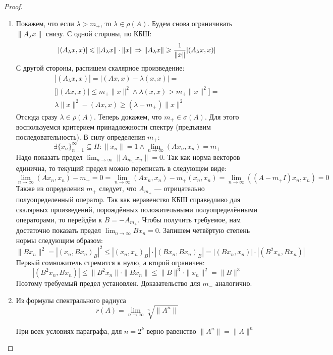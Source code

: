 \begin{proof}~
	\begin{enumerate}
		\item Покажем, что если $\lambda > m_+$, то $\lambda \in \rho(A)$. Будем снова ограничивать $\|A_\lambda x\|$ снизу. С одной стороны, по КБШ:
		\[
			|(A_\lambda x, x)| \leqslant \|A_\lambda x\| \cdot \|x\| \Rightarrow \|A_\lambda x\| \geqslant \frac{1}{\|x\|}|(A_\lambda x, x)|
		\]
		С другой стороны, распишем скалярное произведение:
		\begin{multline*}
			|(A_\lambda x, x)| = |(Ax, x) - \lambda(x, x)| =
			\\
			\Big[|(Ax, x)| \le m_+\|x\|^2 \wedge \lambda(x, x) > m_+\|x\|^2\Big] =
			\\
			\lambda\|x\|^2 - (Ax, x) \ge (\lambda - m_+)\|x\|^2
		\end{multline*}
		Отсюда сразу $\lambda \in \rho(A)$. Теперь докажем, что $m_+ \in \sigma(A)$. Для этого воспользуемся критерием принадлежности спектру (предъявим последовательность). В силу определения $m_+$:
		\[
			\exists \{x_n\}_{n = 1}^\infty \subseteq H \colon \|x_n\| = 1 \wedge \lim_{n \to \infty} (Ax_n, x_n) = m_+
		\]
		Надо показать предел $\lim_{n \to \infty} \|A_{m_+}x_n\| = 0$. Так как норма векторов единична, то текущий предел можно переписать в следующем виде:
		\[
			\lim_{n \to \infty} (Ax_n, x_n) - m_+ = 0 = \lim_{n \to \infty} (Ax_n, x_n) - m_+(x_n, x_n) = \lim_{n \to \infty} ((A - m_+I)x_n, x_n) = 0
		\]
		Также из определения $m_+$ следует, что $A_{m_+}$ --- отрицательно полуопределенный оператор. Так как неравенство КБШ справедливо для скалярных произведений, порождённых положительными полуопределёнными операторами, то перейдём к $B = -A_{m_+}$. Чтобы получить требуемое, нам достаточно показать предел $\lim_{n \to \infty} Bx_n = 0$. Запишем четвёртую степень нормы следующим образом:
		\[
			\|Bx_n\|^2 = |(x_n, Bx_n)_B|^2 \le |(x_n, x_n)_B| \cdot |(Bx_n, Bx_n)_B| = |(Bx_n, x_n)| \cdot |(B^2x_n, Bx_n)|
		\]
		Первый сомножитель стремится к нулю, а второй ограничен:
		\[
			|(B^2x_n, Bx_n)| \le \|B^2x_n\| \cdot \|Bx_n\| \le \|B\|^3 \cdot \|x_n\|^2 = \|B\|^3
		\]
		Поэтому требуемый предел установлен. Доказательство для $m_-$ аналогично.
		
		\item Из формулы спектрального радиуса
		\[
			r(A) = \lim_{n \to \infty} \sqrt[n]{\|A^n\|}
		\]
		\begin{lemma}
			При всех условиях параграфа, для $n = 2^k$ верно равенство $\|A^n\| = \|A\|^n$
		\end{lemma}
		

\end{enumerate}
\end{proof}
